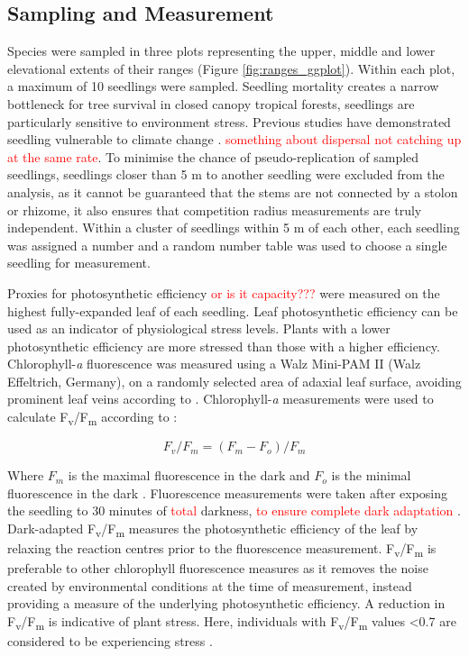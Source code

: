 \documentclass[a4paper,11pt]{article}
\newcommand{\todo}[1]{\textcolor{red}{#1}}   %
\begin{document}
\subsection{Sampling and Measurement}
Species were sampled in three plots representing the upper, middle and lower elevational extents of their ranges (Figure \ref{fig:ranges_ggplot}). Within each plot, a maximum of 10 seedlings were sampled. Seedling mortality creates a narrow bottleneck for tree survival in closed canopy tropical forests, seedlings are particularly sensitive to environment stress. Previous studies have demonstrated seedling vulnerable to climate change \citep{REF}. \todo{something about dispersal not catching up at the same rate}. To minimise the chance of pseudo-replication of sampled seedlings, seedlings closer than 5 m to another seedling were excluded from the analysis, as it cannot be guaranteed that the stems are not connected by a stolon or rhizome, it also ensures that competition radius measurements are truly independent. Within a cluster of seedlings within 5 m of each other, each seedling was assigned a number and a random number table was used to choose a single seedling for measurement.

Proxies for photosynthetic efficiency \todo{or is it capacity???} were measured on the highest fully-expanded leaf of each seedling. Leaf photosynthetic efficiency can be used as an indicator of physiological stress levels. Plants with a lower photosynthetic efficiency are more stressed than those with a higher efficiency. Chlorophyll-\textit{a} fluorescence was measured using a Walz Mini-PAM II (Walz Effeltrich, Germany), on a randomly selected area of adaxial leaf surface, avoiding prominent leaf veins according to \citep{}. Chlorophyll-\textit{a} measurements were used to calculate F\textsubscript{v}/F\textsubscript{m} according to \citet{Genty1989}:

\begin{equation} \label{eq:fvfm}
F_v/F_m = (F_m - F_o)/F_m
\end{equation}

Where $F_m$ is the maximal fluorescence in the dark and $F_o$ is the minimal fluorescence in the dark \citep{Maxwell2000}. Fluorescence measurements were taken after exposing the seedling to 30 minutes of \todo{total} darkness, \todo{to ensure complete dark adaptation} \citep{Campbell2007}. Dark-adapted F\textsubscript{v}/F\textsubscript{m} measures the photosynthetic efficiency of the leaf by relaxing the reaction centres prior to the fluorescence measurement. F\textsubscript{v}/F\textsubscript{m} is preferable to other chlorophyll fluorescence measures as it removes the noise created by environmental conditions at the time of measurement, instead providing a measure of the underlying photosynthetic efficiency. A reduction in F\textsubscript{v}/F\textsubscript{m} is indicative of plant stress. Here, individuals with F\textsubscript{v}/F\textsubscript{m} values <0.7 are considered to be experiencing stress \citep{Maxwell2000}. 
\end{document}
